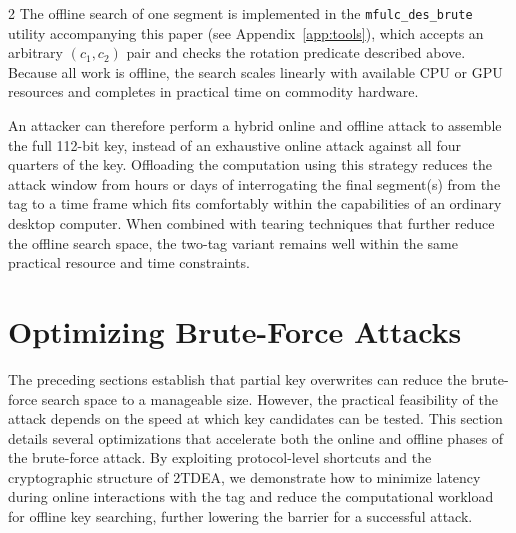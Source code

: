 \documentclass[10pt,letterpaper]{article}
\begin{document}
\begin{multicols}{2}
The offline search of one segment is implemented in the \texttt{mfulc\_des\_brute} utility accompanying this paper (see Appendix~\ref{app:tools}), which accepts an arbitrary $(c_{1},c_{2})$ pair and checks the rotation predicate described above. Because all work is offline, the search scales linearly with available CPU or GPU resources and completes in practical time on commodity hardware.

An attacker can therefore perform a hybrid online and offline attack to assemble the full 112-bit key, instead of an exhaustive online attack against all four quarters of the key. Offloading the computation using this strategy reduces the attack window from hours or days of interrogating the final segment(s) from the tag to a time frame which fits comfortably within the capabilities of an ordinary desktop computer. When combined with tearing techniques that further reduce the offline search space, the two-tag variant remains well within the same practical resource and time constraints.

\section{Optimizing Brute-Force Attacks}
\label{sec:optimize}
The preceding sections establish that partial key overwrites can reduce the brute-force search space to a manageable size. However, the practical feasibility of the attack depends on the speed at which key candidates can be tested. This section details several optimizations that accelerate both the online and offline phases of the brute-force attack. By exploiting protocol-level shortcuts and the cryptographic structure of 2TDEA, we demonstrate how to minimize latency during online interactions with the tag and reduce the computational workload for offline key searching, further lowering the barrier for a successful attack.


\end{multicols}
\end{document}

